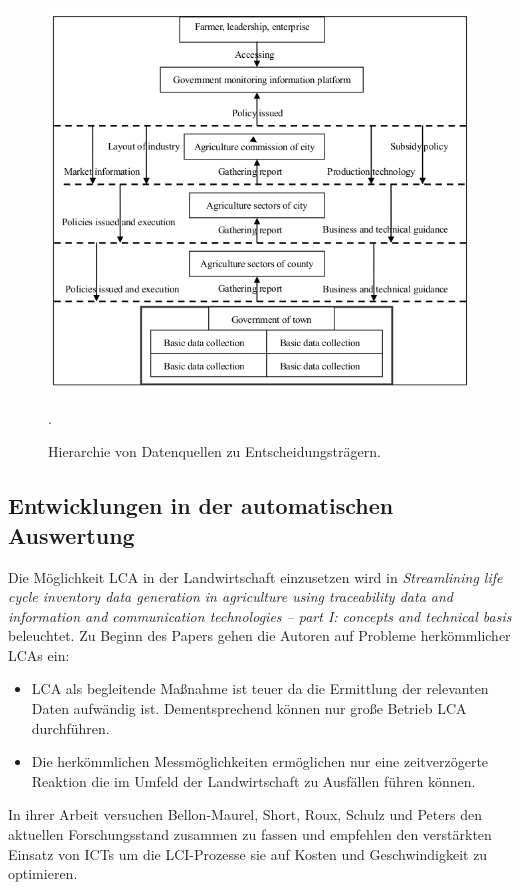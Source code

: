 \begin{figure}[h]
 \includegraphics[scale=0.6,natwidth=\textwidth]{figures/designtools/businessrequirements.png}
 \centering
 \label{fig:fmishierarchy}
 \caption{Hierarchie von Datenquellen zu Entscheidungsträgern. \cite{jour:Wang2013}}.
\end{figure}

\subsection{Entwicklungen in der automatischen Auswertung}
Die Möglichkeit LCA in der Landwirtschaft einzusetzen wird in \textit{Streamlining life cycle inventory data generation in agriculture using traceability data and information and communication technologies – part I: concepts and technical basis} beleuchtet. Zu Beginn des Papers gehen die Autoren auf Probleme herkömmlicher LCAs ein:\cite{jour:Bellon-Maurel2014}
\begin{itemize}
	\item LCA als begleitende Maßnahme ist teuer da die Ermittlung der relevanten Daten aufwändig ist. Dementsprechend können nur große Betrieb LCA durchführen.
	\item Die herkömmlichen Messmöglichkeiten ermöglichen nur eine zeitverzögerte Reaktion die im Umfeld der Landwirtschaft zu Ausfällen führen können.
\end{itemize}

In ihrer Arbeit versuchen Bellon-Maurel, Short, Roux, Schulz und Peters den aktuellen Forschungsstand zusammen zu fassen und empfehlen den verstärkten Einsatz von ICTs um die LCI-Prozesse sie auf Kosten und Geschwindigkeit zu optimieren.\cite{jour:Bellon-Maurel2014}

